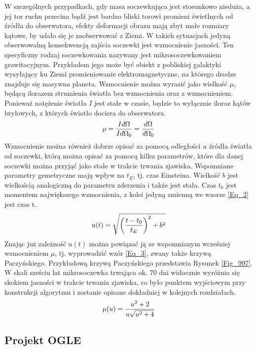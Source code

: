 \documentclass[a4paper,11pt]{article}
\newcommand{\ak}{\hspace{0.7 cm}}
\begin{document}
\ak W szczególnych przypadkach, gdy masa soczewkująca jest stosunkowo nieduża, a jej tor ruchu przecina bądź jest bardzo bliski torowi promieni świetlnych od źródła do obserwatora, efekty deformacji obrazu mają zbyt małe rozmiary kątowe, by udało się je zaobserwować z Ziemi. W takich sytuacjach jedyną obserwowalną konsekwencją zajścia soczewki jest wzmocnienie jasności. Ten specyficzny rodzaj soczewkowania nazywany jest mikrosoczewkowaniem grawitacyjnym. Przykładem jego może być obiekt z pobliskiej galaktyki wysyłający ku Ziemi promieniowanie elektromagnetyczne, na którego drodze znajduje się masywna planeta. Wzmocnienie można wyrazić jako wielkość $\mu$, będącą ilorazem strumienia światła bez wzmocnienia oraz z wzmocnieniem. Ponieważ natężenie światła $I$ jest stałe w czasie, będzie to wyłącznie iloraz kątów bryłowych, z których światło dociera do  obserwatora.\\
\begin{equation}
\centering
\mu=\frac{Id\Omega}{Id\Omega_{0}}=\frac{d\Omega}{d\Omega_{0}}
\label{Eq_1}
\end{equation}
\flushleft
\ak Wzmocnienie można również dobrze opisać za pomocą odległości $u$ źródła światła od soczewki, którą można opisać za pomocą kilku parametrów, które dla danej soczewki można przyjąć jako stałe w trakcie trwania zjawiska. Wspomniane parametry gemetryczne mają wpływ na $t_{E}$, tj. czas Einsteina. Wielkość $b$ jest wielkością analogiczną do parametru zderzenia i także jest stała. Czas $t_{0}$ jest momentem największego wzmocnienia, z kolei jedyną zmienną we wzorze \ref{Eq_2} jest czas {t}.
\begin{equation}
\centering
u(t)=\sqrt{\left(\frac{t-t_{0}}{t_{E}}\right)^{2}+b^{2}}
\label{Eq_2}
\end{equation}
\ak Znając już zależność $u(t)$ można powiązać ją ze wspomnianym wcześniej wzmocnieniem $\mu$, tj. wyprowadzić wzór \ref{Eq_3}, zwany także krzywą Paczyńskiego. Przykładową krzywą Paczyńskiego przedstawia Rysunek \ref{Fig_997}. %
W skali sześciu lat mikrosoczewka trwająca ok. $70$ dni widocznie wyróżnia się skokiem jasności w trakcie trwania zjawiska, co było punktem wyjściowym przy konstrukcji algorytmu i zostanie opisane dokładniej w kolejnych rozdziałach.
\begin{equation}
\centering
\mu(u)=\frac{u^{2}+2}{u\sqrt{u^{2}+4}}
\label{Eq_3}
\end{equation}
\flushleft
\subsection{Projekt OGLE}
\end{document}

